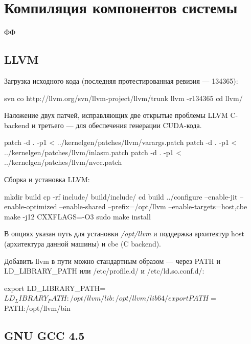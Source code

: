 \documentclass[a4,12pt]{report}
\begin{document}
\section{Компиляция компонентов системы}

ФФ

\subsection{LLVM}

Загрузка исходного кода (последняя протестированная ревизия --- 134365):

\begin{code}
svn co http://llvm.org/svn/llvm-project/llvm/trunk llvm -r134365
cd llvm/
\end{code}

Наложение двух патчей, исправляющих две открытые проблемы LLVM C-backend и третьего --- для обеспечения генерации CUDA-кода.

\begin{code}
patch -d . -p1 < ../kernelgen/patches/llvm/varargs.patch 
patch -d . -p1 < ../kernelgen/patches/llvm/inlasm.patch
patch -d . -p1 < ../kernelgen/patches/llvm/nvcc.patch 
\end{code}

Сборка и установка LLVM:

\begin{code}
mkdir build
cp -rf include/ build/include/
cd build
../configure --enable-jit --enable-optimized --enable-shared --prefix=/opt/llvm
--enable-targets=host,cbe
make -j12 CXXFLAGS=-O3
sudo make install
\end{code}

В опциях указан путь для установки \emph{/opt/llvm} и поддержка архитектур host (архитектура данной машины) и cbe (C backend).

Добавить llvm в пути можно стандартным образом --- через PATH и LD\_LIBRARY\_PATH или /etc/profile.d/ и /etc/ld.so.conf.d/:

\begin{code}
export LD_LIBRARY_PATH=$LD_LIBRARY_PATH:/opt/llvm/lib:/opt/llvm/lib64/
export PATH=$PATH:/opt/llvm/bin
\end{code}


\subsection{GNU GCC 4.5}
\end{document}
